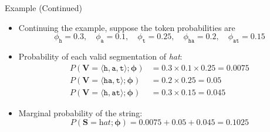 \documentclass[11pt,compress,t,notes=noshow, xcolor=table]{beamer}
\newcommand{\probs}{\boldsymbol{\phi}}
\begin{document}
\begin{frame}{Example (Continued)}

\vfill

\begin{itemize}
\item Continuing the example, suppose the token probabilities are
\begin{equation*}
\phi_{\texttt{h}} = 0.3, \quad \phi_{\texttt{a}} = 0.1, \quad \phi_{\texttt{t}} = 0.25, \quad \phi_{\texttt{ha}} = 0.2, \quad \phi_{\texttt{at}} = 0.15
\end{equation*}
\item Probability of each valid segmentation of \textit{hat}:
\begin{align*}
P(\mathbf{V} = \langle \texttt{h}, \texttt{a}, \texttt{t} \rangle; \probs) &= 0.3 \times 0.1 \times 0.25 = 0.0075\\
P(\mathbf{V} = \langle \texttt{ha}, \texttt{t} \rangle; \probs) &= 0.2 \times 0.25 = 0.05\\
P(\mathbf{V} = \langle \texttt{h}, \texttt{at} \rangle; \probs) &= 0.3 \times 0.15 = 0.045
\end{align*}
\item Marginal probability of the string:
\begin{equation*}
P(\mathbf{S} = \textit{hat}; \probs) = 0.0075 + 0.05 + 0.045 = 0.1025
\end{equation*}
\end{itemize}

\vfill

\end{frame}
\end{document}
